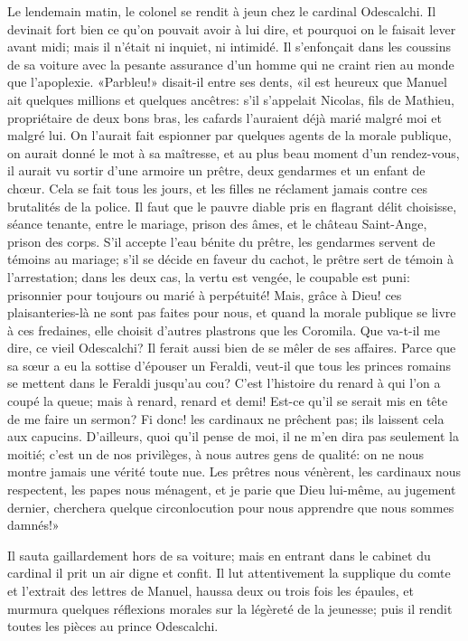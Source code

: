 Le lendemain matin, le colonel se rendit à jeun chez le cardinal Odescalchi. Il devinait fort bien ce qu'on pouvait avoir à lui dire, et pourquoi on le faisait lever avant midi; mais il n'était ni inquiet, ni intimidé. Il s'enfonçait dans les coussins de sa voiture avec la pesante assurance d'un homme qui ne craint rien au monde que l'apoplexie. «Parbleu!» disait-il entre ses dents, «il est heureux que Manuel ait quelques millions et quelques ancêtres: s'il s'appelait Nicolas, fils de Mathieu, propriétaire de deux bons bras, les cafards l'auraient déjà marié malgré moi et malgré lui. On l'aurait fait espionner par quelques agents de la morale publique, on aurait donné le mot à sa maîtresse, et au plus beau moment d'un rendez-vous, il aurait vu sortir d'une armoire un prêtre, deux gendarmes et un enfant de ch\oe{}ur. Cela se fait tous les jours, et les filles ne réclament jamais contre ces brutalités de la police. Il faut que le pauvre diable pris en flagrant délit choisisse, séance tenante, entre le mariage, prison des âmes, et le château Saint-Ange, prison des corps. S'il accepte l'eau bénite du prêtre, les gendarmes servent de témoins au mariage; s'il se décide en faveur du cachot, le prêtre sert de témoin à l'arrestation; dans les deux cas, la vertu est vengée, le coupable est puni: prisonnier pour toujours ou marié à perpétuité! Mais, grâce à Dieu! ces plaisanteries-là ne sont pas faites pour nous, et quand la morale publique se livre à ces fredaines, elle choisit d'autres plastrons que les Coromila. Que va-t-il me dire, ce vieil Odescalchi? Il ferait aussi bien de se mêler de ses affaires. Parce que sa s\oe{}ur a eu la sottise d'épouser un Feraldi, veut-il que tous les princes romains se mettent dans le Feraldi jusqu'au cou? C'est l'histoire du renard à qui l'on a coupé la queue; mais à renard, renard et demi! Est-ce qu'il se serait mis en tête de me faire un sermon? Fi donc! les cardinaux ne prêchent pas; ils laissent cela aux capucins. D'ailleurs, quoi qu'il pense de moi, il ne m'en dira pas seulement la moitié; c'est un de nos privilèges, à nous autres gens de qualité: on ne nous montre jamais une vérité toute nue. Les prêtres nous vénèrent, les cardinaux nous respectent, les papes nous ménagent, et je parie que Dieu lui-même, au jugement dernier, cherchera quelque circonlocution pour nous apprendre que nous sommes damnés!»

Il sauta gaillardement hors de sa voiture; mais en entrant dans le cabinet du cardinal il prit un air digne et confit. Il lut attentivement la supplique du comte et l'extrait des lettres de Manuel, haussa deux ou trois fois les épaules, et murmura quelques réflexions morales sur la légèreté de la jeunesse; puis il rendit toutes les pièces au prince Odescalchi.

